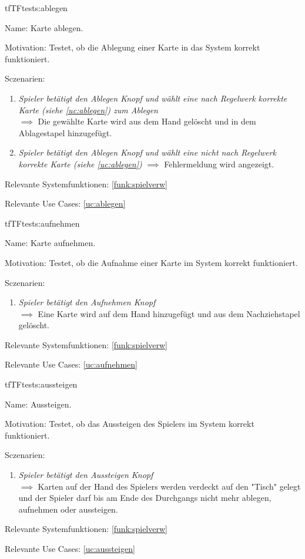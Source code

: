 \begin{description}[leftmargin=5em, style=sameline]
{
\begin{lhp}{tf}{TF}{tests:ablegen}
	\item [Name:] Karte ablegen.
	\item [Motivation:] Testet, ob die Ablegung einer Karte in das System korrekt funktioniert.
	\item [Sczenarien:] \hfill
		\begin{enumerate}
			\item \textit{Spieler betätigt den Ablegen Knopf und wählt eine nach Regelwerk korrekte Karte (siehe \ref{uc:ablegen}) zum Ablegen} \\ $\implies$ Die gewählte Karte wird aus dem Hand gelöscht und in dem Ablagestapel hinzugefügt.
			\item \textit{Spieler betätigt den Ablegen Knopf und wählt eine nicht nach Regelwerk korrekte Karte (siehe \ref{uc:ablegen})}
			$\implies$ Fehlermeldung wird angezeigt.
		\end{enumerate}
	\item [Relevante Systemfunktionen:] \ref{funk:spielverw}
	\item [Relevante Use Cases:] \ref{uc:ablegen}
\end{lhp}
}

{
\begin{lhp}{tf}{TF}{tests:aufnehmen}
	\item [Name:] Karte aufnehmen.
	\item [Motivation:] Testet, ob die Aufnahme einer Karte im System korrekt funktioniert.
	\item [Sczenarien:] \hfill
		\begin{enumerate}
			\item \textit{Spieler betätigt den Aufnehmen Knopf}\\ $\implies$ Eine Karte wird auf dem Hand hinzugefügt und aus dem Nachziehstapel gelöscht.
		\end{enumerate}
	\item [Relevante Systemfunktionen:] \ref{funk:spielverw}
	\item [Relevante Use Cases:] \ref{uc:aufnehmen}
\end{lhp}
}

{
\begin{lhp}{tf}{TF}{tests:aussteigen}
	\item [Name:] Aussteigen.
	\item [Motivation:] Testet, ob das Aussteigen des Spielers im System korrekt funktioniert.
	\item [Sczenarien:] \hfill
		\begin{enumerate}
			\item \textit{Spieler betätigt den Aussteigen Knopf } \\
			$\implies$ Karten auf der Hand des Spielers werden verdeckt auf den "Tisch" gelegt und der Spieler darf bis am Ende des Durchgangs nicht mehr ablegen, aufnehmen oder aussteigen. %
		\end{enumerate}
	\item [Relevante Systemfunktionen:] \ref{funk:spielverw}
	\item [Relevante Use Cases:] \ref{uc:aussteigen}
\end{lhp}
}


\end{description}
